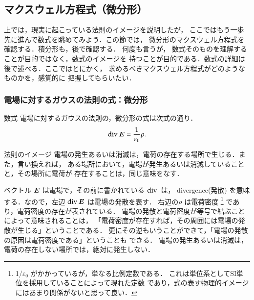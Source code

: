         \subsection{マクスウェル方程式（微分形）}
        \begin{mycomment}
            上では，現実に起こっている法則のイメージを説明したが，
            ここではもう一歩先に進んで数式を眺めてみよう．この節では，
            微分形のマクスウェル方程式を確認する．積分形も，後で確認する．
            何度も言うが，
            数式そのものを理解することが目的ではなく，数式のイメージを
            持つことが目的である．数式の詳細は後で述べる．ここではとにかく，
            求めるべきマクスウェル方程式がどのようなものかを，感覚的に
            把握してもらいたい．
        \end{mycomment}
            \subsubsection{電場に対するガウスの法則の式：微分形}
            \begin{mysmallsec}{数式}
                電場に対するガウスの法則の，微分形の式は次式の通り．
                \begin{align}
                    \mathrm{div}\, \boldsymbol{E} = \frac{1}{\varepsilon_{0}}\rho.
                \end{align}
            \end{mysmallsec}

            \begin{mysmallsec}{法則のイメージ}
                電場の発生あるいは消滅は，電荷の存在する場所で生じる．また，言い換えれば，
                ある場所において，電場が発生あるいは消滅していることと，その場所に電荷が
                存在することは，同じ意味をなす．

                ベクトル $\boldsymbol{E}$ は電場で，その前に書かれている $\mathrm{div}\,$ は，
                divergence(発散) を意味する．なので，左辺 $\mathrm{div}\, \boldsymbol{E}$ は電場の発散を表す．
                右辺の$\rho$ は電荷密度
                    \footnote{
                        1/$\varepsilon_{0}$ がかかっているが，単なる比例定数である．
                        これは単位系としてSI単位を採用していることによって現れた定数
                        であり，式の表す物理的イメージにはあまり関係がないと思って良い．
                    }
                であり，電荷密度の存在が表されている．
                電場の発散と電荷密度が等号で結ぶことによって意味されることは，
                「電荷密度が存在すれば，その周囲には電場の発散が生じる」ということである．
                更にその逆もいうことができて，「電場の発散の原因は電荷密度である」ということも
                できる．
                電場の発生あるいは消滅は，電荷の存在しない場所では，絶対に発生しない．
            \end{mysmallsec}

